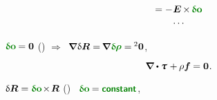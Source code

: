 \begin{equation*}
\begin{array}{c}
= - \hspace{.1ex} \bm{E} \hspace{-0.16ex} \times \hspace{-0.2ex} \constvarvector{o}
\\[.2em]
%
\cdots
\end{array}
\end{equation*}

\vspace{-0.2em}
 ${\constvarvector{o} \hspace{-0.1ex} = \bm{0}}$ () ${\Rightarrow}$~${\hspace{-0.1ex} \boldnabla \hspace{.1ex} \variation{\bm{R}} = \hspace{-0.2ex} \boldnabla \hspace{.1ex} \constvarvector{\hspace{-0.1ex}\bm{\rho}} =  \hspace{-0.12ex} {^2\bm{0}}}$,

\nopagebreak\vspace{-0.2em}\begin{equation*}
\boldnabla \dotp \cauchystress \hspace{.1ex} + \hspace{-0.1ex} \rho \bm{f} \hspace{-0.1ex} = \bm{0}
\hspace{.1ex} .
\end{equation*}

\vspace{-0.1em}
 ${\variation{\bm{R}} = \constvarvector{o} \hspace{-0.33ex} \times \hspace{-0.33ex} \bm{R}}$ () ~${\constvarvector{o} \hspace{-0.1ex} = \boldconstant}$, 

